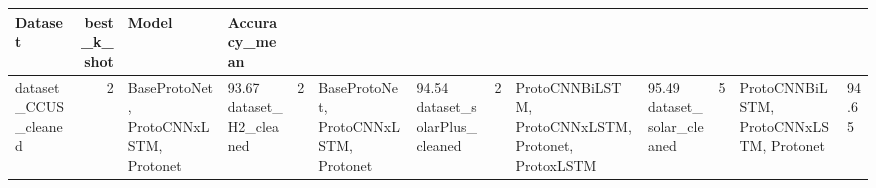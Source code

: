 \begin{tabular}{lrll}
\toprule
Dataset & best_k_shot & Model & Accuracy_mean \\
\midrule
dataset_CCUS_cleaned & 2 & BaseProtoNet, ProtoCNNxLSTM, Protonet & 93.67%
dataset_H2_cleaned & 2 & BaseProtoNet, ProtoCNNxLSTM, Protonet & 94.54%
dataset_solarPlus_cleaned & 2 & ProtoCNNBiLSTM, ProtoCNNxLSTM, Protonet, ProtoxLSTM & 95.49%
dataset_solar_cleaned & 5 & ProtoCNNBiLSTM, ProtoCNNxLSTM, Protonet & 94.65%
\bottomrule
\end{tabular}

